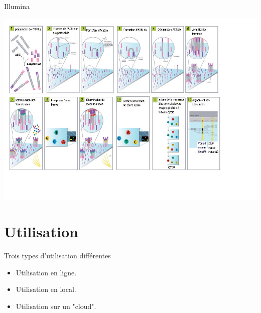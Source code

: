 \documentclass[12pt]{beamer}
\begin{document}
\begin{frame}{Illumina}
\begin{minipage}{0.49\textwidth}
\begin{flushright}
\includegraphics[scale=0.33]{./img/sequfr1.png}
\end{flushright}
\end{minipage}
\end{frame}

\section{Utilisation}

\begin{frame}{Trois types d'utilisation différentes}
\begin{block}{}
\begin{itemize}
\item Utilisation en ligne.
\item Utilisation en local.
\item Utilisation sur un "cloud".
\end{itemize}
\end{block}
\end{frame}
\end{document}
